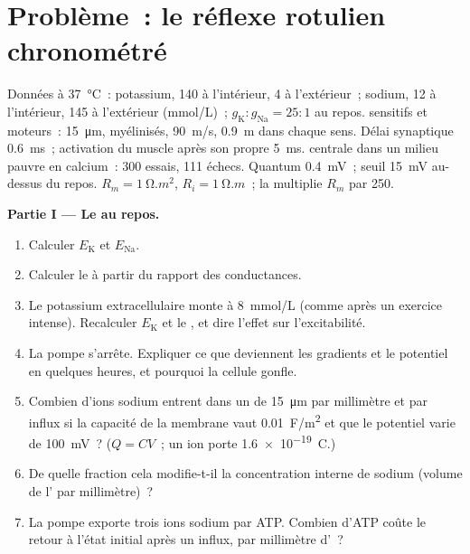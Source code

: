 \section{Problème~: le réflexe rotulien chronométré}

\begin{problem}
\label{pb:b2:neurons-synapses:1}
Données à \qty{37}{\celsius}~: potassium, 140 à l'intérieur, 4 à
l'extérieur~; sodium, 12 à l'intérieur,
145 à l'extérieur (\unit{mmol/L})~; $g_{\mathrm K} : g_{\mathrm{Na}} = 25 : 1$
au repos.  sensitifs et moteurs~: \qty{15}{\micro m}, myélinisés,
\qty{90}{m/s}, \qty{0.9}{m} dans chaque sens. Délai synaptique \qty{0.6}{ms}~;
activation du muscle après son propre  \qty{5}{ms}.
 centrale dans un milieu pauvre en calcium~: 300 essais, 111
échecs. Quantum \qty{0.4}{mV}~; seuil \qty{15}{mV} au-dessus du repos. $R_m =
\qty{1}{\ohm.m^2}$, $R_i = \qty{1}{\ohm.m}$~; la  multiplie $R_m$
par 250.

\medskip
\noindent\textbf{Partie I --- Le  au repos.}
\begin{enumerate}
  \item Calculer $E_{\mathrm K}$ et $E_{\mathrm{Na}}$.
  \item Calculer le  à partir du rapport des conductances.
  \item Le potassium extracellulaire monte à \qty{8}{mmol/L} (comme
        après un exercice intense). Recalculer $E_{\mathrm K}$ et le
        , et dire l'effet sur l'excitabilité.
  \item La pompe s'arrête. Expliquer ce que deviennent les gradients et
        le potentiel en quelques heures, et pourquoi la cellule gonfle.
  \item Combien d'ions sodium entrent dans un  de \qty{15}{\micro m}
        par millimètre et par influx si la capacité de la membrane vaut
        \qty{0.01}{F/m^2} et que le potentiel varie de \qty{100}{mV}~?
        ($Q = CV$~; un ion porte \qty{1.6e-19}{C}.)
  \item De quelle fraction cela modifie-t-il la concentration interne
        de sodium (volume de l' par millimètre)~?
  \item La pompe exporte trois ions sodium par ATP. Combien d'ATP
        coûte le retour à l'état initial après un influx, par millimètre d'~?
\end{enumerate}


\end{problem}
